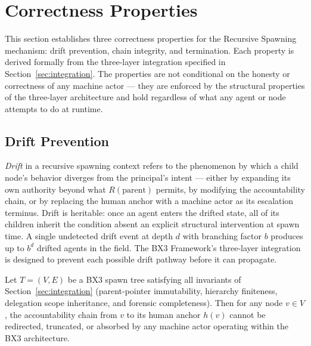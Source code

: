 \section{Correctness Properties}
\label{sec:correctness}

This section establishes three correctness properties for the Recursive Spawning
mechanism: drift prevention, chain integrity, and termination. Each property is
derived formally from the three-layer integration specified in
Section~\ref{sec:integration}. The properties are not conditional on the honesty
or correctness of any machine actor — they are enforced by the structural
properties of the three-layer architecture and hold regardless of what any agent
or node attempts to do at runtime.

\subsection{Drift Prevention}
\label{sec:drift-prevention}

\textit{Drift} in a recursive spawning context refers to the phenomenon by which
a child node's behavior diverges from the principal's intent — either by
expanding its own authority beyond what $R(\text{parent})$ permits, by modifying
the accountability chain, or by replacing the human anchor with a machine actor
as its escalation terminus. Drift is heritable: once an agent enters the drifted
state, all of its children inherit the condition absent an explicit structural
intervention at spawn time. A single undetected drift event at depth $d$ with
branching factor $b$ produces up to $b^d$ drifted agents in the field. The BX3
Framework's three-layer integration is designed to prevent each possible drift
pathway before it can propagate.

\begin{theorem}
\label{th:drift-prevention}
Let $T = (V, E)$ be a BX3 spawn tree satisfying all invariants of
Section~\ref{sec:integration} (parent-pointer immutability, hierarchy finiteness,
delegation scope inheritance, and forensic completeness). Then for any node
$v \in V$, the accountability chain from $v$ to its human anchor $h(v)$ cannot
be redirected, truncated, or absorbed by any machine actor operating within the
BX3 architecture.
\end{theorem}

